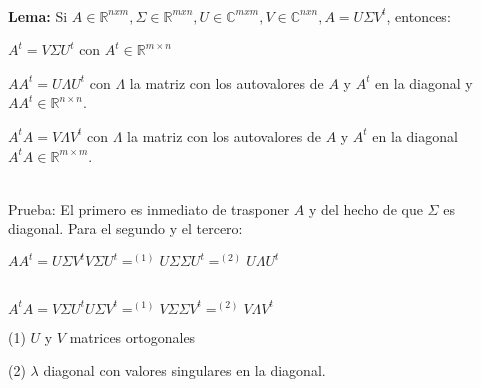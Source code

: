 \ \\
\textbf{Lema:} Si $A \in \mathbb{R}^{nxm},\Sigma \in \mathbb{R}^{mxn}, U \in \mathbb{C}^{mxm}, V \in
\mathbb{C}^{nxn}, A = U \Sigma V^t$, entonces:
\begin{compactitem}
  \item $A^t = V \Sigma U^t $ con $A^t \in \mathbb{R}^{m \times n}$
  \item $A A^t = U \Lambda U^t $ con $\Lambda$ la matriz con los autovalores de $A$ y $A^t$ en
    la diagonal y $A A^t \in \mathbb{R}^{n \times n}$.
  \item $A^t A = V \Lambda V^t $ con $\Lambda$ la matriz con los autovalores de $A$ y $A^t$ en
    la diagonal $A^t A \in \mathbb{R}^{m \times m}$.
\end{compactitem}

\ \\
Prueba: El primero es inmediato de trasponer $A$ y del hecho de que $\Sigma$ es diagonal. Para el
segundo y el tercero:
\begin{center}
$A A^t = U \Sigma V^t V \Sigma U^t =^{(1)} U \Sigma \Sigma U^t =^{(2)} U \Lambda U^t$

\ \\
$A^t A = V \Sigma U^t U \Sigma V^t =^{(1)} V \Sigma \Sigma V^t =^{(2)} V \Lambda V^t$
\end{center}

(1) $U$ y $V$ matrices ortogonales

(2) $\lambda$ diagonal con valores singulares en la diagonal.


